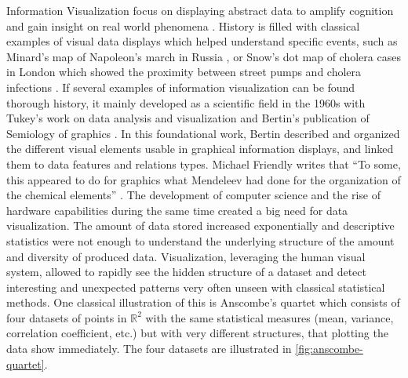 Information Visualization focus on displaying abstract data to amplify cognition and gain insight on real world phenomena \cite{cardReadingsInformationVisualization1999}.
History is filled with classical examples of visual data displays which helped understand specific events, such as Minard's map of Napoleon's march in Russia \cite{friendlyVisionsReVisionsCharles2002}, or Snow's dot map of cholera cases in London which showed the proximity between street pumps and cholera infections \cite{snowModeCommunicationCholera1856}.
If several examples of information visualization can be found thorough history, it mainly developed as a scientific field in the 1960s with Tukey's work on data analysis and visualization \cite{tukeyFutureDataAnalysis1962} and Bertin's publication of Semiology of graphics \cite{bertin1967}.
In this foundational work, Bertin described and organized the different visual elements usable in graphical information displays, and linked them to data features and relations types.
Michael Friendly writes that ``To some, this appeared to do for graphics what Mendeleev had done for the organization of the chemical elements'' \cite{friendlyBriefHistoryData2008}.
The development of computer science and the rise of hardware capabilities during the same time created a big need for data visualization.
The amount of data stored increased exponentially \cite{hilbertWorldTechnologicalCapacity2011} and descriptive statistics were not enough to understand the underlying structure of the amount and diversity of produced data.
Visualization, leveraging the human visual system, allowed to rapidly see the hidden structure of a dataset and detect interesting and unexpected patterns very often unseen with classical statistical methods.
One classical illustration of this is Anscombe's quartet \cite{anscombeGraphsStatisticalAnalysis1973} which consists of four datasets of points in $\mathbb{R} ^{2}$ with the same statistical measures (mean, variance, correlation coefficient, etc.) but with very different structures, that plotting the data show immediately.
The four datasets are illustrated in \autoref{fig:anscombe-quartet}.


